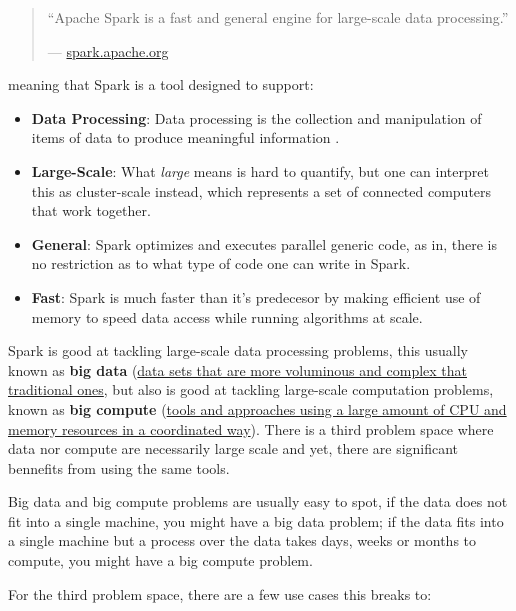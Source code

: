 \documentclass[]{book}
\providecommand{\tightlist}{%
  \setlength{\itemsep}{0pt}\setlength{\parskip}{0pt}}
\theoremstyle{definition}
\theoremstyle{definition}
\theoremstyle{definition}
\theoremstyle{remark}
\begin{document}
\begin{quote}
``Apache Spark is a fast and general engine for large-scale data
processing.''

--- \href{http://spark.apache.org/}{spark.apache.org}
\end{quote}

meaning that Spark is a tool designed to support:

\begin{itemize}
\tightlist
\item
  \textbf{Data Processing}: Data processing is the collection and
  manipulation of items of data to produce meaningful information
  \citep{data-processing}.
\item
  \textbf{Large-Scale}: What \emph{large} means is hard to quantify, but
  one can interpret this as cluster-scale instead, which represents a
  set of connected computers that work together.
\item
  \textbf{General}: Spark optimizes and executes parallel generic code,
  as in, there is no restriction as to what type of code one can write
  in Spark.
\item
  \textbf{Fast}: Spark is much faster than it's predecesor by making
  efficient use of memory to speed data access while running algorithms
  at scale.
\end{itemize}

Spark is good at tackling large-scale data processing problems, this
usually known as \textbf{big data}
(\href{https://en.wikipedia.org/wiki/big_data}{data sets that are more
voluminous and complex that traditional ones}, but also is good at
tackling large-scale computation problems, known as \textbf{big compute}
(\href{https://www.nimbix.net/glossary/big-compute/}{tools and
approaches using a large amount of CPU and memory resources in a
coordinated way}). There is a third problem space where data nor compute
are necessarily large scale and yet, there are significant bennefits
from using the same tools.

Big data and big compute problems are usually easy to spot, if the data
does not fit into a single machine, you might have a big data problem;
if the data fits into a single machine but a process over the data takes
days, weeks or months to compute, you might have a big compute problem.

For the third problem space, there are a few use cases this breaks to:
\end{document}
